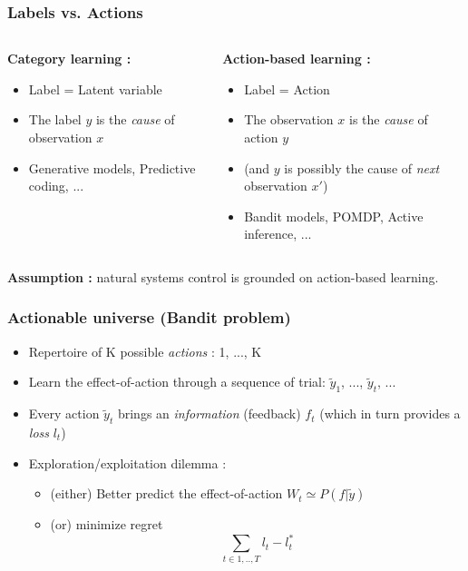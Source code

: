 \documentclass{beamer}
\begin{document}
\begin{frame}\frametitle{Labels vs. Actions}
	\begin{columns}
		
		\begin{column}{.48 \linewidth}
			{\bf Category learning :}
			\begin{itemize}
			\item Label = Latent variable
			\item The label $y$ is the \emph{cause} of observation $x$ 
			\item Generative models, Predictive coding, ...
			\end{itemize}
		\end{column}

		\begin{column}{.48 \linewidth}
			{\bf Action-based learning :}
			\begin{itemize}
			\item Label = Action
			\item The observation $x$ is the \emph{cause} of action $y$
			\item (and $y$ is possibly the cause of \emph{next} observation $x'$)
			\item Bandit models, POMDP, Active inference, ...
			\end{itemize}
		\end{column}
	\end{columns}
\begin{exampleblock}{}
	{\bf Assumption :} natural systems control is grounded on action-based learning.
\end{exampleblock}
\end{frame}

\begin{frame}\frametitle{Actionable universe (Bandit problem)}
	\begin{itemize}
		\item Repertoire of K possible \emph{actions} : 1, ..., K
		\item Learn the effect-of-action through a sequence of trial: $\tilde {y}_1$, ..., $\tilde{y}_t$, ...
		\item Every action $\tilde{y}_t$ brings an \textit{information} (feedback) $f_t$ 
		(which in turn provides a \textit{loss} $l_t$)
		\item Exploration/exploitation dilemma :
		\begin{itemize}
			\item (either) Better predict the effect-of-action $W_t \simeq P(f|\tilde{y})$
			\item (or) minimize regret $$ \sum_{t \in 1,..,T} l_t - l^*_t$$ 
		\end{itemize}
	\end{itemize}
\end{frame}
\end{document}
